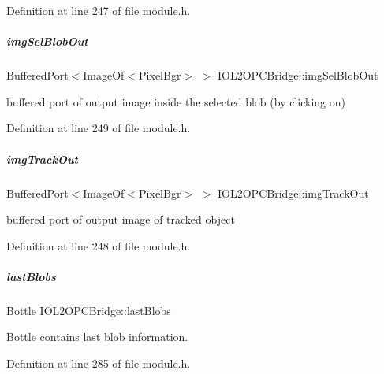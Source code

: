 Definition at line 247 of file module.\+h.

\mbox{\label{group__iol2opc_a87d83209572c282b7705963c5bb7b7cb}} 
\subparagraph{\texorpdfstring{img\+Sel\+Blob\+Out}{imgSelBlobOut}}
{\footnotesize\ttfamily Buffered\+Port$<$Image\+Of$<$Pixel\+Bgr$>$ $>$ I\+O\+L2\+O\+P\+C\+Bridge\+::img\+Sel\+Blob\+Out\hspace{0.3cm}{\ttfamily [protected]}}



buffered port of output image inside the selected blob (by clicking on) 



Definition at line 249 of file module.\+h.

\mbox{\label{group__iol2opc_a7c0aeec18511fb66b6281b82ddd14c24}} 
\subparagraph{\texorpdfstring{img\+Track\+Out}{imgTrackOut}}
{\footnotesize\ttfamily Buffered\+Port$<$Image\+Of$<$Pixel\+Bgr$>$ $>$ I\+O\+L2\+O\+P\+C\+Bridge\+::img\+Track\+Out\hspace{0.3cm}{\ttfamily [protected]}}



buffered port of output image of tracked object 



Definition at line 248 of file module.\+h.

\mbox{\label{group__iol2opc_a7755982592a2045ad9c7558e5ca61548}} 
\subparagraph{\texorpdfstring{last\+Blobs}{lastBlobs}}
{\footnotesize\ttfamily Bottle I\+O\+L2\+O\+P\+C\+Bridge\+::last\+Blobs\hspace{0.3cm}{\ttfamily [protected]}}



Bottle contains last blob information. 



Definition at line 285 of file module.\+h.

